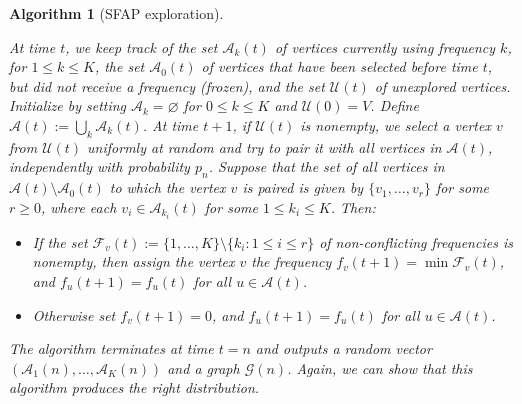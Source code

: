 \documentclass[11pt,a4paper, reqno]{article}
\newtheorem{algo}{Algorithm}
\begin{document}
\begin{algo}[{SFAP exploration}]\label{algo-sfap}
{\normalfont
At time $t$, we keep track of the set  $\mathcal{A}_k(t)$ of vertices currently using frequency $k$, for $1\leq k\leq K$, the set $\mathcal{A}_0(t)$ of vertices that have been selected before time $t$, but did not receive a frequency (frozen), and the set $\mathcal{U}(t)$ of unexplored vertices. Initialize by setting $\mathcal{A}_{k}=\varnothing$ for $0\leq k\leq K$ and $\mathcal{U}(0)=V$.
Define $\mathcal{A}(t):=\bigcup_{k}\mathcal{A}_k(t)$.
At time $t+1$, if $\mathcal{U}(t)$ is nonempty, we select a vertex $v$ from $\mathcal{U}(t)$ uniformly at random and try to pair it with all vertices in $\mathcal{A}(t)$, independently with probability $p_n$.
Suppose that the set of all vertices in $\mathcal{A}(t)\setminus\mathcal{A}_0(t)$ to which the vertex $v$ is paired is given by $\{v_1,\dots,v_r\}$ for some $r\geq 0$, where each $v_i\in \mathcal{A}_{k_i}(t)$ for some $1\leq k_i\leq K$. Then:
\begin{itemize}
\item If the set $\mathcal{F}_v(t):=\{1,\dots,K\}\setminus \{k_i:1\leq i\leq r\}$ of non-conflicting frequencies is nonempty, then assign the vertex $v$ the frequency $f_v(t+1)=\min \mathcal{F}_v(t)$, and $f_u(t+1)=f_u(t)$ for all $u\in \mathcal{A}(t)$.
\item Otherwise set $f_v(t+1)=0$, and $f_u(t+1)=f_u(t)$ for all $u\in \mathcal{A}(t)$.
\end{itemize}
The algorithm terminates at time $t=n$ and outputs a random vector $(\mathcal{A}_1(n),\ldots,\mathcal{A}_K(n))$ and a graph $\mathcal{G}(n)$. Again, we can show that this algorithm produces the right distribution.
}
\end{algo}
\end{document}
